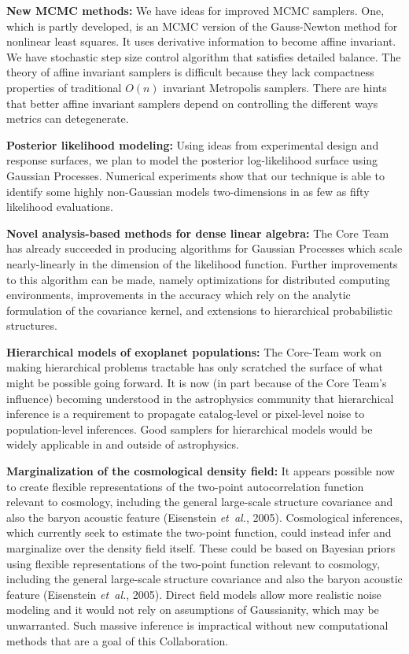 \documentclass[11pt]{article}
\newcommand{\foreign}[1]{\textsl{#1}}
\newcommand{\etal}{\foreign{et~al.}}
\begin{document}
\textbf{New MCMC methods:}
We have ideas for improved MCMC samplers.
One, which is partly developed, is an MCMC version of the Gauss-Newton
method for nonlinear least squares.
It uses derivative information to become affine invariant.
We have stochastic step size control algorithm that satisfies
detailed balance.
The theory of affine invariant samplers is difficult because they
lack compactness properties of traditional $O(n)$ invariant Metropolis
samplers.
There are hints that better affine invariant samplers depend on 
controlling the different ways metrics can detegenerate.

\textbf{Posterior likelihood modeling:}
Using ideas from experimental design and response surfaces, we plan to 
model the posterior log-likelihood surface using
Gaussian Processes.
Numerical experiments show that our technique is able to
identify some highly non-Gaussian models two-dimensions in as few as
fifty likelihood evaluations.

\textbf{Novel analysis-based methods for dense linear algebra:}
The Core Team has already succeeded in producing algorithms for Gaussian
Processes which scale nearly-linearly in the dimension of the likelihood
function.
Further improvements to this algorithm can be made, namely optimizations
for distributed computing environments, improvements in the accuracy
which rely on the analytic formulation of the covariance kernel, and
extensions to hierarchical probabilistic structures.

\textbf{Hierarchical models of exoplanet populations:}
The Core-Team work on making hierarchical problems tractable has
only scratched the surface of what might be possible going forward.
It is now (in part because of the Core Team's influence) becoming
understood in the astrophysics community that hierarchical inference
is a requirement to propagate catalog-level or pixel-level noise to
population-level inferences.
Good samplers for hierarchical models would be widely applicable in
and outside of astrophysics.

\textbf{Marginalization of the cosmological density field:} 
It appears possible now to create flexible representations of the
two-point autocorrelation function relevant to cosmology, including
the general large-scale structure covariance and also the baryon
acoustic feature (Eisenstein \etal, 2005).
Cosmological inferences, which currently seek to estimate the two-point 
function, could instead infer and marginalize over the density field itself.
These could be based on Bayesian priors using flexible representations of the
two-point function relevant to cosmology, including
the general large-scale structure covariance and also the baryon
acoustic feature (Eisenstein \etal, 2005).
Direct field models allow more realistic noise modeling and it would not rely
on assumptions of Gaussianity, which may be unwarranted.
Such massive inference is impractical without new computational methods
that are a goal of this Collaboration.
\end{document}
